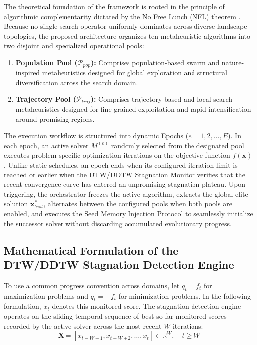 \documentclass[review]{elsarticle}
\begin{document}
The theoretical foundation of the framework is rooted in the principle of algorithmic complementarity dictated by the No Free Lunch (NFL) theorem \cite{wolpert1997no}. Because no single search operator uniformly dominates across diverse landscape topologies, the proposed architecture organizes ten metaheuristic algorithms into two disjoint and specialized operational pools:
\begin{enumerate}
    \item \textbf{Population Pool ($\mathcal{P}_{pop}$):} Comprises population-based swarm and nature-inspired metaheuristics designed for global exploration and structural diversification across the search domain.
    \item \textbf{Trajectory Pool ($\mathcal{P}_{traj}$):} Comprises trajectory-based and local-search metaheuristics designed for fine-grained exploitation and rapid intensification around promising regions.
\end{enumerate}

The execution workflow is structured into dynamic Epochs ($e = 1, 2, \dots, E$). In each epoch, an active solver $M^{(e)}$ randomly selected from the designated pool executes problem-specific optimization iterations on the objective function $f(\mathbf{x})$. Unlike static schedules, an epoch ends when its configured iteration limit is reached or earlier when the DTW/DDTW Stagnation Monitor verifies that the recent convergence curve has entered an unpromising stagnation plateau. Upon triggering, the orchestrator freezes the active algorithm, extracts the global elite solution $\mathbf{x}_{best}^*$, alternates between the configured pools when both pools are enabled, and executes the Seed Memory Injection Protocol to seamlessly initialize the successor solver without discarding accumulated evolutionary progress.



\subsection{Mathematical Formulation of the DTW/DDTW Stagnation Detection Engine}
\label{sec:dtw_formulation}

To use a common progress convention across domains, let $q_t=f_t$ for maximization problems and $q_t=-f_t$ for minimization problems. In the following formulation, $x_t$ denotes this monitored score. The stagnation detection engine operates on the sliding temporal sequence of best-so-far monitored scores recorded by the active solver across the most recent $W$ iterations:
\begin{equation}
\mathbf{X} = \left[ x_{t-W+1}, x_{t-W+2}, \dots, x_t \right] \in \mathbb{R}^W, \quad t \ge W
\label{eq:sliding_window}
\end{equation}
\end{document}
